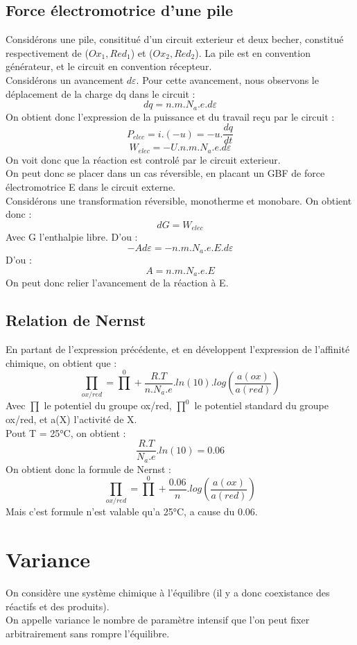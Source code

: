 \subsection{Force électromotrice d'une pile}
Considérons une pile, consititué d'un circuit exterieur et deux becher, constitué respectivement de ($Ox_1,Red_1$) et ($Ox_2,Red_2$). La pile est en convention générateur, et le circuit en convention récepteur.\\
Considérons un avancement $d\varepsilon$. Pour cette avancement, nous observons le déplacement de la charge dq dans le circuit : 
$$dq=n.m.N_a.e.d\varepsilon$$
On obtient donc l'expression de la puissance et du travail reçu par le circuit :
$$P_{elec} = i.(-u) = -u.\dfrac{dq}{dt}$$
$$W_{elec} = -U.n.m.N_a.e.d\varepsilon$$
On voit donc que la réaction est controlé par le circuit exterieur.\\
On peut donc se placer dans un cas réversible, en placant un GBF de force électromotrice E dans le circuit externe.\\
Considérons une transformation réversible, monotherme et monobare. On obtient donc : 
$$dG = W_{elec}$$
Avec G l'enthalpie libre. D'ou : 
$$-Ad\varepsilon = -n.m.N_a.e.E.d\varepsilon$$
D'ou :
$$A = n.m.N_a.e.E$$
On peut donc relier l'avancement de la réaction à E.
\subsection{Relation de Nernst}
En partant de l'expression précédente, et en développent l'expression de l'affinité chimique, on obtient que :
$$\prod_{ox/red} = \prod ^0+\dfrac{R.T}{n.N_a.e}.ln(10).log(\dfrac{a(ox)}{a(red)})$$
Avec $\prod$ le potentiel du groupe ox/red, $\prod^0$ le potentiel standard du groupe ox/red, et a(X) l'activité de X.\\
Pout T = 25°C, on obtient : 
$$\dfrac{R.T}{N_a.e}.ln(10) = 0.06$$
On obtient donc la formule de Nernst : 
$$\prod_{ox/red} = \prod^0+\dfrac{0.06}{n}.log\left(\dfrac{a(ox)}{a(red)}\right)$$
Mais c'est formule n'est valable qu'a 25°C, a cause du 0.06.
\section{Variance}
\begin{de}
On considère une système chimique à l'équilibre (il y a donc coexistance des réactifs et des produits).\\
On appelle variance le nombre de paramètre intensif que l'on peut fixer arbitrairement sans rompre l'équilibre.
\end{de}

